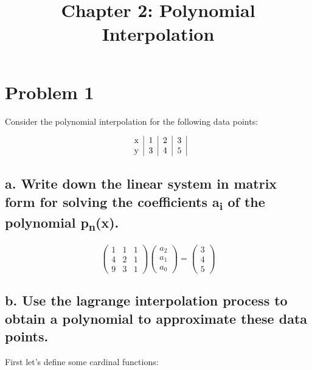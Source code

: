 \documentclass[]{article}
\title{Chapter 2: Polynomial Interpolation}
\author{}
\date{}
\begin{document}
\maketitle

{
\setcounter{tocdepth}{2}
\tableofcontents
}
\section{Problem 1}\label{problem-1}

Consider the polynomial interpolation for the following data points:

\[
\begin{tabular}{c|c|c|c|}
x & 1 & 2 & 3\\
y & 3 & 4 & 5
\end{tabular}
\]

\subsection{\texorpdfstring{a. Write down the linear system in matrix
form for solving the coefficients a\textsubscript{i} of the polynomial
p\textsubscript{n}(x).}{a. Write down the linear system in matrix form for solving the coefficients ai of the polynomial pn(x).}}\label{a.-write-down-the-linear-system-in-matrix-form-for-solving-the-coefficients-ai-of-the-polynomial-pnx.}

\[
\left(\begin{array}{ccc} 
1 & 1 & 1\\
4 & 2 & 1\\
9 & 3 & 1 
\end{array}\right)
\left(\begin{array}{c} 
a_2 \\
a_1 \\
a_0
\end{array}\right) =
\left(\begin{array}{c}
3 \\
4 \\
5
\end{array}\right)
\]

\subsection{b. Use the lagrange interpolation process to obtain a
polynomial to approximate these data
points.}\label{b.-use-the-lagrange-interpolation-process-to-obtain-a-polynomial-to-approximate-these-data-points.}

First let's define some cardinal functions:
\end{document}
